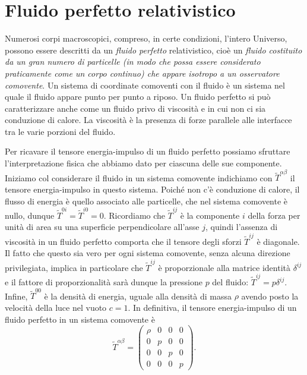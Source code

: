 \section{Fluido perfetto relativistico}
\label{sec:fluido-perfetto}

Numerosi corpi macroscopici, compreso, in certe condizioni, l'intero Universo,
possono essere descritti da un \emph{fluido perfetto}
relativistico, cioè un
\emph{fluido costituito da un gran numero di particelle (in modo che possa
  essere considerato praticamente come un corpo continuo) che appare isotropo a
  un osservatore comovente}.
Un sistema di coordinate comoventi con il fluido è un sistema nel quale il
fluido appare punto per punto a riposo.  Un fluido perfetto si può
caratterizzare anche come un fluido privo di viscosità e in cui non ci sia
conduzione di calore.  La viscosità è la presenza di forze parallele alle
interfacce tra le varie porzioni del fluido.

Per ricavare il tensore energia-impulso di un fluido perfetto possiamo sfruttare
l'interpretazione fisica che abbiamo dato per ciascuna delle sue componente.
Iniziamo col considerare il fluido in un sistema comovente indichiamo con
$\tilde{T}^{\alpha\beta}$ il tensore energia-impulso in questo sistema.  Poiché
non c'è conduzione di calore, il flusso di energia è quello associato alle
particelle, che nel sistema comovente è nullo, dunque
$\tilde{T}^{0i} = \tilde{T}^{i0} = 0$.  Ricordiamo che $\tilde{T}^{ij}$ è la
componente $i$ della forza per unità di area su una superficie perpendicolare
all'asse $j$, quindi l'assenza di viscosità in un fluido perfetto comporta che
il tensore degli sforzi $\tilde{T}^{ij}$ è diagonale.  Il fatto che questo sia
vero per ogni sistema comovente, senza alcuna direzione privilegiata, implica in
particolare che $\tilde{T}^{ij}$ è proporzionale alla matrice identità
$\delta^{ij}$ e il fattore di proporzionalità sarà dunque la pressione $p$ del
fluido: $\tilde{T}^{ij} = p \delta^{ij}$.  Infine, $\tilde{T}^{00}$ è la densità
di energia, uguale alla densità di massa $\rho$ avendo posto la velocità della
luce nel vuoto $c = 1$.  In definitiva, il tensore energia-impulso di un fluido
perfetto in un sistema comovente è
\begin{equation}
  \tilde{T}^{\alpha\beta} =
  \begin{pmatrix}
    \rho & 0 & 0 & 0 \\
    0    & p & 0 & 0 \\
    0    & 0 & p & 0 \\
    0    & 0 & 0 & p
  \end{pmatrix}.
\end{equation}

